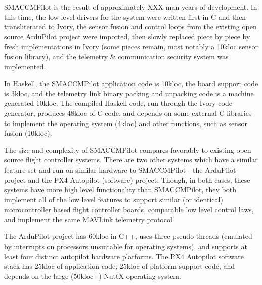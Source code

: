 SMACCMPilot is the result of approximately XXX man-years of development. In this
time, the low level drivers for the system were written first in C and then
transliterated to Ivory, the sensor fusion and control loops from the existing
open source ArduPilot project were imported, then slowly replaced piece by piece
by fresh implementations in Ivory (some pieces remain, most notably a 10kloc
sensor fusion library), and the telemetry \& communication security system was
implemented.

In Haskell, the SMACCMPilot application code is 10kloc, the board support code
is 3kloc, and the telemetry link binary packing and unpacking code is a machine
generated 10kloc. The compiled Haskell code, run through the Ivory code
generator, produces 48kloc of C code, and depends on some external C libraries
to implement the operating system (4kloc) and other functions, such as sensor
fusion (10kloc).

The size and complexity of SMACCMPilot compares favorably to existing open
source flight controller systems. There are two other systems which have a
similar feature set and run on similar hardware to SMACCMPilot - the ArduPilot
project and the PX4 Autopilot (software) project. Though, in both cases, these
systems have more high level functionality than SMACCMPilot, they both implement
all of the low level features to support similar (or identical) microcontroller
based flight controller boards, comparable low level control laws, and implement
the same MAVLink telemetry protocol.

The ArduPilot project has 60kloc in C++, uses three pseudo-threads (emulated by
interrupts on processors unsuitable for operating systems), and supports at
least four distinct autopilot hardware platforms. The PX4 Autopilot software
stack has 25kloc of application code, 25kloc of platform support code, and
depends on the large (50kloc+) NuttX operating system.

